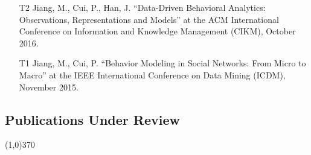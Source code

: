\documentclass[10pt]{article}
\newenvironment{myindentpar}[1]%
{\begin{list}{}%
         {\setlength{\leftmargin}{#1}}%
         \item[]%
}
{\end{list}}
\newcounter{list}
\begin{document}
\begin{myindentpar}{0.00cm}
\begin{enumerate}[leftmargin=.5cm]
\item[T2] Jiang, M., Cui, P., Han, J. ``Data-Driven Behavioral Analytics: Observations, Representations and Models'' at the ACM International Conference on Information and Knowledge Management (CIKM), October 2016.
		
\item[T1] Jiang, M., Cui, P. ``Behavior Modeling in Social Networks: From Micro to Macro'' at the IEEE International Conference on Data Mining (ICDM), November 2015.

\end{enumerate}

\end{myindentpar}

\subsection{\sc Publications Under Review}
\vspace{-0.4cm} \line(1,0){370} \vspace{-0.1cm}
\end{document}
